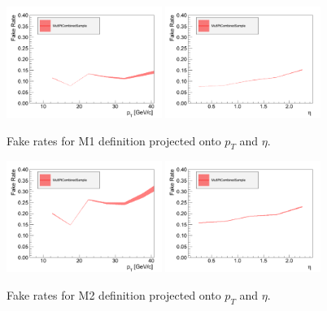 \begin{figure}[!htbp]
\begin{center}
\includegraphics[width=0.45\textwidth]{figures/muon_frpt_m1.pdf}
\includegraphics[width=0.45\textwidth]{figures/muon_freta_m1.pdf}
\caption{Fake rates for M1 definition projected onto $p_T$ and $\eta$.}
\label{fig:mu_fr_M1_jet15}
\end{center}
\end{figure}

\begin{figure}[!htbp]
\begin{center}
\includegraphics[width=0.45\textwidth]{figures/muon_frpt_m2.pdf}
\includegraphics[width=0.45\textwidth]{figures/muon_freta_m2.pdf}
\caption{Fake rates for M2 definition projected onto $p_T$ and $\eta$.}
\label{fig:mu_fr_M2_jet15}
\end{center}
\end{figure}


